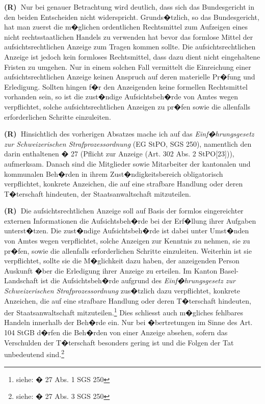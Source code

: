\documentclass[paper=a4,fontsize=12pt, oneside, numbers=noenddot]{scrbook}
\newcounter{rz}
\newcommand{\Rz}{\addtocounter{rz}{1}\textbf{(R\arabic{rz})~}}
\begin{document}
	\Rz Nur bei genauer Betrachtung wird deutlich, dass sich das Bundesgericht in den beiden Entscheiden nicht widerspricht. Grunds�tzlich, so das Bundesgericht, hat man zuerst die m�glichen ordentlichen Rechtsmittel zum Aufzeigen eines nicht rechtsstaatlichen Handels zu verwenden hat bevor das formlose Mittel der aufsichtsrechtlichen Anzeige zum Tragen kommen sollte. Die aufsichtsrechtlichen Anzeige ist jedoch kein formloses Rechtsmittel, dass dazu dient nicht eingehaltene Fristen zu umgehen. Nur in einem solchen Fall vermittelt die Einreichung einer aufsichtsrechtlichen Anzeige keinen Anspruch auf deren materielle Pr�fung und Erledigung. Sollten hingen f�r den Anzeigenden keine formellen Rechtsmittel vorhanden sein, so ist die zust�ndige Aufsichtsbeh�rde von Amtes wegen verpflichtet, solche aufsichtsrechtlichen Anzeigen zu pr�fen sowie die allenfalls erforderlichen Schritte einzuleiten.
	
	\Rz Hinsichtlich des vorherigen Absatzes mache ich auf das  \textit{Einf�hrungsgesetz zur Schweizerischen Strafprozessordnung} (EG StPO, SGS 250), namentlich den darin enthaltenen � 27 (Pflicht zur Anzeige (Art. 302 Abs. 2 StPO[23])), aufmerksam. Danach sind  die Mitglieder sowie Mitarbeiter der kantonalen und kommunalen Beh�rden in ihrem Zust�ndigkeitsbereich obligatorisch verpflichtet, konkrete Anzeichen, die auf eine strafbare Handlung oder deren T�terschaft hindeuten, der Staatsanwaltschaft mitzuteilen.  
	
	\Rz Die aufsichtsrechtlichen Anzeige soll auf Basis der formlos eingereichter externen Informationen die Aufsichtsbeh�rde bei der Erf�llung ihrer Aufgaben unterst�tzen. Die zust�ndige Aufsichtsbeh�rde ist dabei unter Umst�nden von Amtes wegen verpflichtet, solche Anzeigen zur Kenntnis zu nehmen, sie zu pr�fen, sowie die allenfalls erforderlichen Schritte einzuleiten. Weiterhin ist sie verpflichtet, sollte sie die M�glichkeit dazu haben, der anzeigenden Person Auskunft �ber die Erledigung ihrer Anzeige zu erteilen. Im Kanton Basel-Landschaft ist die Aufsichtsbeh�rde aufgrund des \textit{Einf�hrungsgesetz zur Schweizerischen Strafprozessordnung} zus�tzlich dazu verpflichtet, konkrete Anzeichen, die auf eine strafbare Handlung oder deren T�terschaft hindeuten, der Staatsanwaltschaft mitzuteilen.\footnote{siehe: � 27 Abs. 1 SGS 250} Dies schliesst auch m�gliches fehlbares Handeln innerhalb der Beh�rde ein. Nur bei �bertretungen im Sinne des Art. 104 StGB  d�rfen die Beh�rden von einer Anzeige absehen, sofern das Verschulden der T�terschaft besonders gering ist und die Folgen der Tat unbedeutend sind.\footnote{siehe: � 27 Abs. 3 SGS 250}
	
\end{document}
